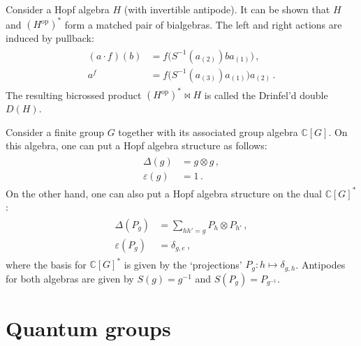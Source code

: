     \begin{construct}
        Consider a Hopf algebra $H$ (with invertible antipode). It can be shown that $H$ and $(H^{\text{op}})^*$ form a matched pair of bialgebras. The left and right actions are induced by pullback:
        \begin{gather}
            \begin{aligned}
                (a\cdot f)(b) &= f\bigl(S^{-1}(a_{(2)})ba_{(1)}\bigr)\,,\\
                a^f &= f\bigl(S^{-1}(a_{(3)})a_{(1)}\bigr)a_{(2)}\,.
            \end{aligned}
        \end{gather}
        The resulting bicrossed product $(H^{\text{op}})^*\bowtie H$ is called the Drinfel'd double $D(H)$.
    \end{construct}
    \begin{example}
        Consider a finite group $G$ together with its associated group algebra $\mathbb{C}[G]$. On this algebra, one can put a Hopf algebra structure as follows:
        \begin{gather}
            \begin{aligned}
                \Delta(g) &= g\otimes g\,,\\
                \varepsilon(g) &= 1\,.
            \end{aligned}
        \end{gather}
        On the other hand, one can also put a Hopf algebra structure on the dual $\mathbb{C}[G]^*$:
        \begin{gather}
            \begin{aligned}
                \Delta(P_g) &= \sum_{hh'=g}P_h\otimes P_{h'}\,,\\
                \varepsilon(P_g) &= \delta_{g,e}\,,
            \end{aligned}
        \end{gather}
        where the basis for $\mathbb{C}[G]^*$ is given by the `projections' $P_g:h\mapsto\delta_{g,h}$. Antipodes for both algebras are given by $S(g)=g^{-1}$ and $S(P_g)=P_{g^{-1}}$.

    \end{example}

\section{Quantum groups}

